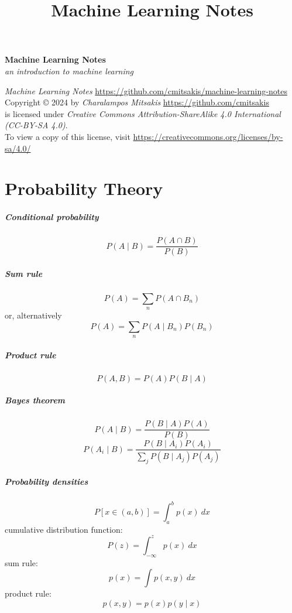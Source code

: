 \documentclass{report}
\title{Machine Learning Notes}
\begin{document}
\vspace*{2cm}
\begin{center}
	\Huge\textbf{Machine Learning Notes}\\
	\LARGE\textit{an introduction to machine learning}
\end{center}
\vspace*{2cm}

\textit{Machine Learning Notes} \url{https://github.com/cmitsakis/machine-learning-notes} \\
Copyright © 2024 by \textit{Charalampos Mitsakis} \url{https://github.com/cmitsakis} \\
is licensed under \textit{Creative Commons Attribution-ShareAlike 4.0 International (CC-BY-SA 4.0)}. \\
To view a copy of this license, visit \url{https://creativecommons.org/licenses/by-sa/4.0/}


\chapter{Probability Theory}

\paragraph*{Conditional probability}
\[P(A \mid B) = \frac{P(A \cap B)}{P(B)}\]

\paragraph*{Sum rule}
\[P(A)=\sum_n P(A \cap B_n)\]
or, alternatively
\[P(A)=\sum_n P(A \mid B_n) P(B_n)\]

\paragraph*{Product rule}
\[P(A, B) = P(A) P(B \mid A)\]

\paragraph*{Bayes theorem}
\[P(A \mid B) = \frac{P(B \mid A) P(A)}{P(B)}\]
\[P(A_i \mid B) = \frac{P(B \mid A_i) P(A_i)}{\sum\limits_j P(B \mid A_j) P(A_j)}\]

\paragraph*{Probability densities}
\[P[x \in (a, b)] = \int_a^b p(x)\ dx\]
cumulative distribution function:
\[P(z) = \int_{-\infty}^z p(x)\ dx\]
sum rule:
\[p(x) = \int p(x, y)\ dx\]
product rule:
\[p(x, y) = p(x) p(y \mid x)\]
\end{document}
